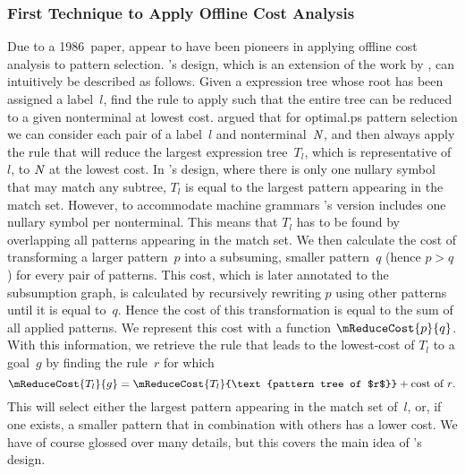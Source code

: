 \subsubsection{First Technique to Apply Offline Cost Analysis}

Due to a 1986~paper, \textcite{HatcherChristopher:1986} appear to have been
pioneers in applying \gls{offline cost analysis} to \gls{pattern selection}.
%
\citeauthor{HatcherChristopher:1986}'s design, which is an extension of the work
by \citeauthor{HoffmannODonnell:1982}, can intuitively be described as follows.
%
Given a \gls{expression tree} whose \gls{root} has been assigned a label~$l$,
find the \gls{rule} to apply such that the entire \gls{tree} can be reduced to a
given \gls{nonterminal} at lowest cost.
%
\citeauthor{HatcherChristopher:1986} argued that for \gls{optimal.ps}
\gls{pattern selection} we can consider each pair of a label~$l$ and
\gls{nonterminal}~$\mNT{N}$, and then always apply the \gls{rule} that will
reduce the largest \gls{expression tree}~$T_l$, which is representative of~$l$,
to $\mNT{N}$ at the lowest cost.
%
In \citeauthor{HoffmannODonnell:1982}'s design, where there is only one
\gls{nullary symbol} that may match any \gls{subtree}, $T_l$ is equal to the
largest \gls{pattern} appearing in the \gls{match set}.
%
However, to accommodate \glspl{machine grammar}
\citeauthor{HatcherChristopher:1986}'s version includes one \gls{nullary symbol}
per \gls{nonterminal}.
%
This means that $T_l$ has to be found by overlapping all \glspl{pattern}
appearing in the \gls{match set}.
%
We then calculate the cost of transforming a larger \gls{pattern}~$p$ into a
subsuming, smaller \gls{pattern}~$q$ (hence \mbox{$p > q$}) for every pair of
\glspl{pattern}.
%
This cost, which is later annotated to the \gls{subsumption graph}, is
calculated by recursively rewriting $p$ using other \glspl{pattern} until it is
equal to~$q$.
%
Hence the cost of this transformation is equal to the sum of all applied
\glspl{pattern}.
%
We represent this cost with a function $\mReduceCost{p}{q}$.
%
With this information, we retrieve the \gls{rule} that leads to the lowest-cost
 of $T_l$ to a goal~$g$ by finding the \gls{rule}~$r$
for which
%
\begin{displaymath}
  \mReduceCost{T_l}{g} =
  \mReduceCost{T_l}{\text{pattern tree of $r$}} + \text{cost of $r$}.
\end{displaymath}
%
This will select either the largest \gls{pattern} appearing in the \gls{match
  set} of~$l$, or, if one exists, a smaller \gls{pattern} that in combination
with others has a lower cost.
%
We have of course glossed over many details, but this covers the main idea of
\citeauthor{HatcherChristopher:1986}'s design.

